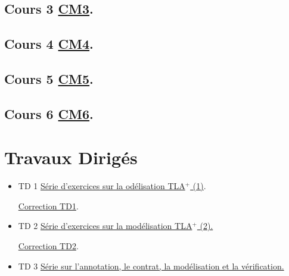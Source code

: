 \documentclass[ 12pt]{article}
\begin{document}
\begin{tcolorbox}
\subsection{Cours 3
  \href{http://mery54.github.io/teaching/mvsi/lecturesnotes/lectures-app-2024-cm3.pdf}{CM3}. }



\subsection{Cours 4
  \href{http://mery54.github.io/teaching/mvsi/lecturesnotes/lectures-app-2024-cm4.pdf}{CM4}. }




\subsection{Cours 5
  \href{http://mery54.github.io/teaching/mvsi/lecturesnotes/lectures-app-2024-2.pdf}{CM5}. }




\subsection{Cours 6
  \href{http://mery54.github.io/teaching/mvsi/lecturesnotes/lectures-app-2024-3.pdf}{CM6}. }

  

\section{Travaux Dirigés}

  \begin{itemize}
  \item[]   TD 1 
    \href{http://mery54.github.io/teaching/mvsi/lecturesnotes/td1.pdf}{Série d'exercices sur la od\'elisation TLA$^+$  (1)}.

       \href{http://mery54.github.io/teaching/mvsi/lecturesnotes/ctd1.pdf}{Correction 
       TD1}.

       
  \item[]   TD 2 
    \href{http://mery54.github.io/teaching/mvsi/lecturesnotes/td2.pdf}{Série
      d'exercices sur la mod\'elisation TLA$^+$ (2).}   

          \href{http://mery54.github.io/teaching/mvsi/lecturesnotes/ctd2.pdf}{Correction 
            TD2}.
          
  \item[]   TD 3 
    \href{http://mery54.github.io/teaching/mvsi/lecturesnotes/td3.pdf}{
      Série sur l'annotation, le contrat, la  mod\'elisation et  la v\'erification.}


\end{itemize}
\end{tcolorbox}
\end{document}

